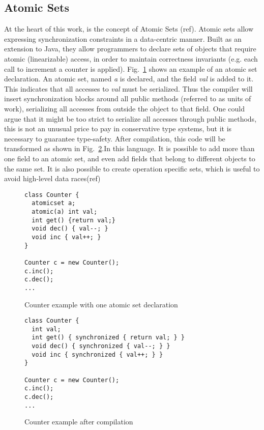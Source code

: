 \subsection{Atomic Sets}
At the heart of this work, is the concept of Atomic Sets (ref). Atomic sets allow 
expressing synchronization constraints in a
data-centric manner. Built as an extension to Java, they allow programmers to
declare sets of objects that require atomic (linearizable) access, in order to
maintain correctness invariants (e.g. each call to increment a counter is
applied). Fig.~\ref{lst:acCounter} shows an example of an atomic set
declaration. An atomic set, named \emph{a} is declared, and the field \emph{val}
is added to it. This indicates that all accesses to \emph{val} must be
serialized. Thus the compiler will insert synchronization blocks around all
public methods (referred to as units of work), serializing all accesses from
outside the object to that field. One could argue that it might be too strict to
serialize all accesses through public methods, this is not an unusual price to
pay in conservative type systems, but it is
necessary to guarantee type-safety. After compilation, this code will be
transformed as shown in Fig.~\ref{lst:acCounterCompiled}.In this language. 
It is possible to add more than one field to an atomic set, 
and even add fields that belong to different
objects to the same set. It is also possible to create operation specific sets,
which is useful to avoid high-level data races(ref)
 
\begin{figure}[tp]
\begin{lstlisting}
class Counter {
  atomicset a;
  atomic(a) int val;
  int get() {return val;}
  void dec() { val--; }
  void inc { val++; }
}

Counter c = new Counter();
c.inc();
c.dec();
...
\end{lstlisting}
\caption{Counter example with one atomic set declaration}
\label{lst:acCounter}
\end{figure}

\begin{figure}[tp]
\begin{lstlisting}
class Counter {
  int val;
  int get() { synchronized { return val; } }
  void dec() { synchronized { val--; } }
  void inc { synchronized { val++; } }
}

Counter c = new Counter();
c.inc();
c.dec();
...
\end{lstlisting}
\caption{Counter example after compilation}
\label{lst:acCounterCompiled}
\end{figure}

